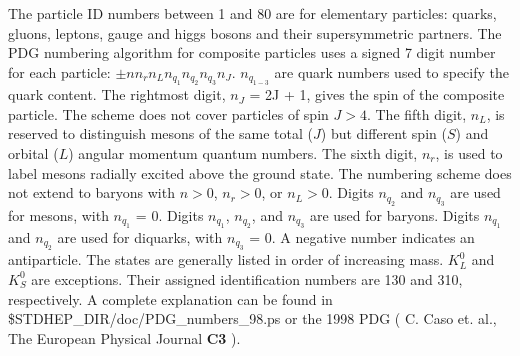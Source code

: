 The particle ID numbers between 1 and 80 are for elementary particles:
quarks, gluons, leptons, gauge and higgs bosons and their supersymmetric
partners. 
The PDG numbering algorithm for composite particles uses a 
signed 7 digit number for each particle:  $\pm nn_rn_Ln_{q_1}n_{q_2}n_{q_3}n_J$.
$n_{q_{1-3}}$ are quark numbers used to specify the quark content.
The rightmost digit, $n_J$ = 2J + 1, gives the spin of the composite particle.
The scheme does not cover particles of spin $J>4$.
The fifth digit, $n_L$, is reserved to distinguish mesons of the
same total ($J$) but different spin ($S$) and orbital ($L$)
angular momentum quantum numbers.
The sixth digit, $n_r$, is used to label mesons radially excited
above the ground state.
The numbering scheme does not extend to baryons with $n>0$, $n_r>0$, or $n_L>0$.
Digits $n_{q_2}$ and $n_{q_3}$ are used for mesons, with $n_{q_1}$ = 0.
Digits $n_{q_1}$, $n_{q_2}$, and $n_{q_3}$ are used for baryons.
Digits $n_{q_1}$ and $n_{q_2}$ are used for diquarks, with $n_{q_3}$ = 0. 
A negative number
indicates an antiparticle.  The states are generally listed in order of
increasing mass.  $K_L^0$ and $K_S^0$ are exceptions.  Their assigned
identification numbers are 130 and 310, respectively.
A complete explanation can be found in \$STDHEP\_DIR/doc/PDG\_numbers\_98.ps
or the 1998 PDG
( C. Caso et. al., The European Physical Journal {\bf C3} ).



\vspace{0.2 in}

